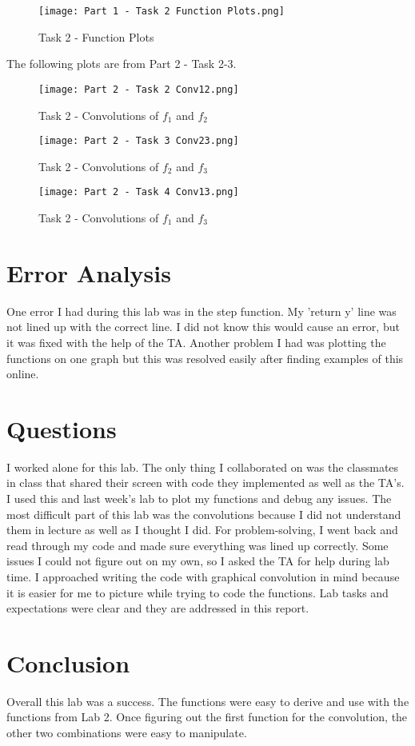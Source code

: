 \documentclass[12pt]{report}
\begin{document}
\begin{figure}[ht]
\begin{center}
\texttt{[image: Part 1 - Task 2 Function Plots.png]}
\caption{Task 2 - Function Plots}
\end{center}
\end{figure}

The following plots are from Part 2 - Task 2-3.\\
\begin{figure}[ht]
\begin{center}
\texttt{[image: Part 2 - Task 2 Conv12.png]}
\caption{Task 2 - Convolutions of $f_1$ and $f_2$}
\end{center}
\end{figure}

\newpage

\begin{figure}[ht]
\begin{center}
\texttt{[image: Part 2 - Task 3 Conv23.png]}
\caption{Task 2 - Convolutions of $f_2$ and $f_3$}
\end{center}
\end{figure}

\begin{figure}[ht]
\begin{center}
\texttt{[image: Part 2 - Task 4 Conv13.png]}
\caption{Task 2 - Convolutions of $f_1$ and $f_3$}
\end{center}
\end{figure}

\newpage
\section{Error Analysis}
\noindent One error I had during this lab was in the step function. My 'return y' line was not lined up with the correct line. I did not know this would cause an error, but it was fixed with the help of the TA. Another problem I had was plotting the functions on one graph but this was resolved easily after finding examples of this online. 

\section{Questions}
\noindent I worked alone for this lab. The only thing I collaborated on was the classmates in class that shared their screen with code they implemented as well as the TA's. I used this and last week's lab to plot my functions and debug any issues. The most difficult part of this lab was the convolutions because I did not understand them in lecture as well as I thought I did. For problem-solving, I went back and read through my code and made sure everything was lined up correctly. Some issues I could not figure out on my own, so I asked the TA for help during lab time. I approached writing the code with graphical convolution in mind because it is easier for me to picture while trying to code the functions. Lab tasks and expectations were clear and they are addressed in this report. 

\section{Conclusion}
\noindent Overall this lab was a success. The functions were easy to derive and use with the functions from Lab 2. Once figuring out the first function for the convolution, the other two combinations were easy to manipulate. 
\end{document}
